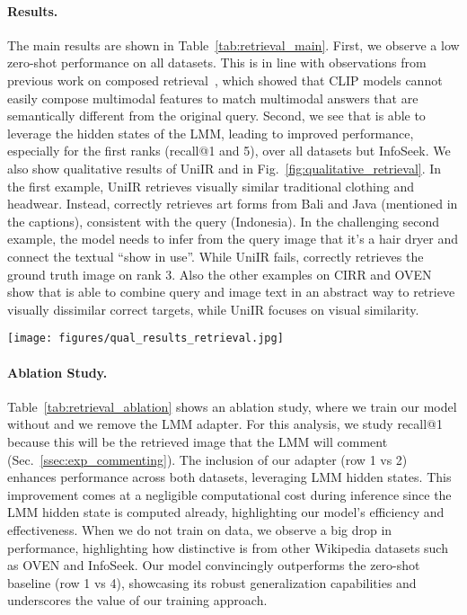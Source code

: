 \paragraph{Results.} 
The main results are shown in Table~\ref{tab:retrieval_main}.
First, we observe a low zero-shot performance on all datasets.
This is in line with observations from previous work on composed retrieval~\cite{wei2023uniir,zhang2024magiclens}, which showed that CLIP models cannot easily compose multimodal features to match multimodal answers that are semantically different from the original query.
Second, we see that \modelname is able to leverage the hidden states of the LMM, leading to improved performance, especially for the first ranks (recall@1 and 5), over all datasets but InfoSeek. 
%
We also show qualitative results of UniIR and \modelname in Fig.~\ref{fig:qualitative_retrieval}. In the first example, UniIR retrieves visually similar traditional clothing and headwear. Instead, \modelname correctly retrieves art forms from Bali and Java (mentioned in the captions), consistent with the query (Indonesia). In the challenging second example, the model needs to infer from the query image that it's a hair dryer and connect the textual ``show in use''. While UniIR fails, \modelname correctly retrieves the ground truth image on rank 3. Also the other examples on CIRR and OVEN show that \modelname is able to combine query and image text in an abstract way to retrieve visually dissimilar correct targets, while UniIR focuses on visual similarity.

\begin{figure*}
  \centering
   \texttt{[image: figures/qual\_results\_retrieval.jpg]}
   \caption{\underline{Qualitative results retrieval.} We show retrieved images for UniIR and \modelname on three datasets. Captions are not displayed because of space limits.}
   \label{fig:qualitative_retrieval}
\end{figure*}

\paragraph{Ablation Study.} 
Table~\ref{tab:retrieval_ablation} shows an ablation study, where we train our model without \wikicomment and we remove the LMM adapter.
For this analysis, we study recall@1 because this will be the retrieved image that the LMM will comment (Sec.~\ref{ssec:exp_commenting}).
The inclusion of our adapter (row 1 vs 2) enhances performance across both datasets, leveraging LMM hidden states. This improvement comes at a negligible computational cost during inference since the LMM hidden state is computed already, highlighting our model's efficiency and effectiveness.
When we do not train on \wikicomment data, we observe a big drop in performance, highlighting how distinctive \wikicomment is from other Wikipedia datasets such as OVEN and InfoSeek.
%
%
Our model convincingly outperforms the zero-shot baseline (row 1 vs 4), showcasing its robust generalization capabilities and underscores the value of our training approach.
%
 

